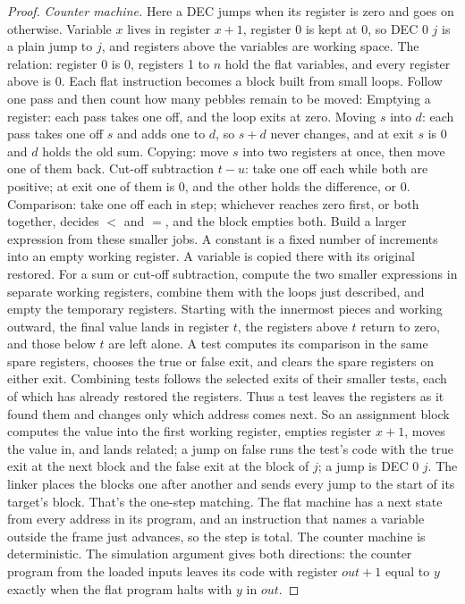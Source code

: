 \documentclass[11pt,twoside]{article}
\theoremstyle{thielethm}
\theoremstyle{thieledef}
\theoremstyle{thieledef}
\theoremstyle{thieledef}
\theoremstyle{thielethm}
\theoremstyle{thieleobs}
\theoremstyle{thielethm}
\begin{document}
\begin{proof}
\emph{Counter machine.} Here a DEC jumps when its register is zero and goes on otherwise. Variable
$x$ lives in register $x + 1$, register 0 is kept at 0, so DEC 0 $j$ is a plain jump to $j$, and
registers above the variables are working space. The relation: register 0 is 0, registers 1 to
$n$ hold the flat variables, and every register above is 0. Each flat instruction becomes a block built from small loops. Follow one
pass and then count how many pebbles remain to be moved:
Emptying a register: each pass takes one off, and the loop exits at zero. Moving $s$ into $d$:
each pass takes one off $s$ and adds one to $d$, so $s + d$ never changes, and at exit $s$ is 0
and $d$ holds the old sum. Copying: move $s$ into two registers at once, then move one of them
back. Cut-off subtraction $t - u$: take one off each while both are positive; at exit one of them
is 0, and the other holds the difference, or 0. Comparison: take one off each in step; whichever
reaches zero first, or both together, decides $<$ and $=$, and the block empties both. Build a larger expression from these smaller jobs. A constant is a
fixed number of increments into an empty working register. A variable is
copied there with its original restored. For a sum or cut-off subtraction,
compute the two smaller expressions in separate working registers, combine
them with the loops just described, and empty the temporary registers.
Starting with the innermost pieces and working outward, the final value
lands in register $t$, the registers above $t$ return to zero, and those
below $t$ are left alone. A test computes its comparison in the same spare
registers, chooses the true or false exit, and clears the spare registers
on either exit. Combining tests follows the selected exits of their smaller
tests, each of which has already restored the registers. Thus a test leaves
the registers as it found them and changes only which address comes next. So an
assignment block computes the value into the first working register, empties register $x + 1$,
moves the value in, and lands related; a jump on false runs the test's code with the true exit at
the next block and the false exit at the block of $j$; a jump is DEC 0 $j$. The linker places the
blocks one after another and sends every jump to the start of its target's block. That's the
one-step matching. The flat machine has a next state from every address in its program, and an
instruction that names a variable outside the frame just advances, so the step is total. The
counter machine is deterministic. The simulation argument gives both directions: the counter
program from the loaded inputs leaves its code with register $\mathit{out} + 1$ equal to $y$
exactly when the flat program halts with $y$ in $\mathit{out}$.


\end{proof}
\end{document}
